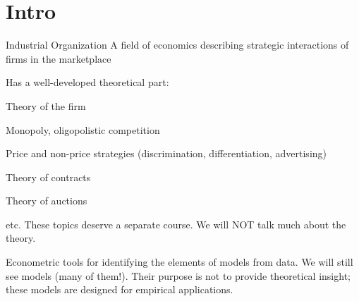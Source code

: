 \begin{frame}
	\titlepage
\end{frame}

\section{Intro}

\begin{frame}{Industrial Organization}
	A field of economics describing strategic interactions of firms in the marketplace
	\bi
		\item{Has a well-developed theoretical part:
		\bi
			\item{Theory of the firm}
			\item{Monopoly, oligopolistic competition}
			\item{Price and non-price strategies (discrimination, differentiation, advertising)}
			\item{Theory of contracts}
			\item{Theory of auctions}
			\item{etc.}
		\ei
		These topics deserve a separate course. We will NOT talk much about the theory.
		}
		\item{Econometric tools for identifying the elements of models from data.
		}
	\ei
	\medskip
		We will still see models (many of them!). Their purpose is not to provide theoretical insight; these models are designed for empirical applications.
\end{frame}

%
%	
%	
%	
%	

